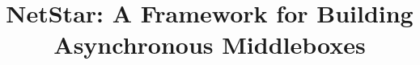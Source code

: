 \documentclass[preprint]{sigplanconf-eurosys}
\begin{document}

\iffalse
\conferenceinfo{CONF 'yy}{Month d--d, 20yy, City, ST, Country}
\copyrightyear{20yy}
\copyrightdata{978-1-nnnn-nnnn-n/yy/mm}
\copyrightdoi{nnnnnnn.nnnnnnn}
\fi


\titlebanner{}        %
\preprintfooter{}   %

\title{NetStar: A Framework for Building Asynchronous Middleboxes}
%



\maketitle



\begin{abstract}

\end{abstract}



\newpage



\end{document}
